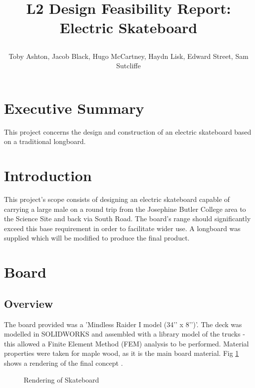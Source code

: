 \documentclass[journal,10pt]{IEEEtran}
\title{ 
\begin{huge}
\textbf{L2 Design Feasibility Report: Electric Skateboard} 
\end{huge} }
\author{Toby Ashton, Jacob Black, Hugo McCartney, Haydn Lisk, Edward Street, Sam Sutcliffe}
\begin{document}
\maketitle
\tableofcontents
\newpage
\section{Executive Summary}
        This project concerns the design and construction of an electric skateboard based on a traditional longboard.
\section{Introduction}
        This project's scope consists of designing an electric skateboard capable of carrying a large male on a round trip from the Josephine Butler College area to the Science Site and back via South Road. The board's range should significantly exceed this base requirement in order to facilitate wider use. A longboard was supplied which will be modified to produce the final product. 
\section{Board}
    \subsection{Overview}
        The board provided was a 'Mindless Raider I model (34’’ x 8’’)’\cite{boardModel}. The deck was modelled in SOLIDWORKS and assembled with a library model of the trucks \cite{trucksCAD} - this allowed a Finite Element Method (FEM) analysis to be performed. Material properties were taken for maple wood, as it is the main board material. Fig \ref{fig:Board_Rendering} shows a rendering of the final concept \cite{shoesCAD}. 
        \begin{figure}[H]
                \centering
                \caption{
                Rendering of Skateboard}
                \label{fig:Board_Rendering}
            \end{figure} 
\end{document}
